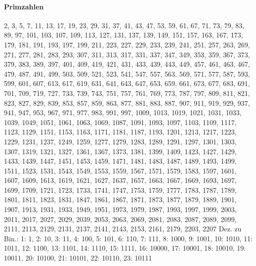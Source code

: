 \documentclass[8pt,a4paper,landscape]{article}
\begin{document}
\paragraph{Primzahlen}
\footnotesize 2,     3,     5,     7,    11,    13,    17,    19,    23,    29,    31,    37,    41,    43,
   47,    53,    59,    61,    67,    71,    73,    79,    83,    89,    97,   101,   103,   107,
  109,   113,   127,   131,   137,   139,   149,   151,   157,   163,   167,   173,   179,   181,
  191,   193,   197,   199,   211,   223,   227,   229,   233,   239,   241,   251,   257,   263,
  269,   271,   277,   281,   283,   293,   307,   311,   313,   317,   331,   337,   347,   349,
  353,   359,   367,   373,   379,   383,   389,   397,   401,   409,   419,   421,   431,   433,
  439,   443,   449,   457,   461,   463,   467,   479,   487,   491,   499,   503,   509,   521,
  523,   541,   547,   557,   563,   569,   571,   577,   587,   593,   599,   601,   607,   613,
  617,   619,   631,   641,   643,   647,   653,   659,   661,   673,   677,   683,   691,   701,
  709,   719,   727,   733,   739,   743,   751,   757,   761,   769,   773,   787,   797,   809,
  811,   821,   823,   827,   829,   839,   853,   857,   859,   863,   877,   881,   883,   887,
  907,   911,   919,   929,   937,   941,   947,   953,   967,   971,   977,   983,   991,   997,
 1009,  1013,  1019,  1021,  1031,  1033,  1039,  1049,  1051,  1061,  1063,  1069,  1087,  1091,
 1093,  1097,  1103,  1109,  1117,  1123,  1129,  1151,  1153,  1163,  1171,  1181,  1187,  1193,
 1201,  1213,  1217,  1223,  1229,  1231,  1237,  1249,  1259,  1277,  1279,  1283,  1289,  1291,
 1297,  1301,  1303,  1307,  1319,  1321,  1327,  1361,  1367,  1373,  1381,  1399,  1409,  1423,
 1427,  1429,  1433,  1439,  1447,  1451,  1453,  1459,  1471,  1481,  1483,  1487,  1489,  1493,
 1499,  1511,  1523,  1531,  1543,  1549,  1553,  1559,  1567,  1571,  1579,  1583,  1597,  1601,
 1607,  1609,  1613,  1619,  1621,  1627,  1637,  1657,  1663,  1667,  1669,  1693,  1697,  1699,
 1709,  1721,  1723,  1733,  1741,  1747,  1753,  1759,  1777,  1783,  1787,  1789,  1801,  1811,
 1823,  1831,  1847,  1861,  1867,  1871,  1873,  1877,  1879,  1889,  1901,  1907,  1913,  1931,
 1933,  1949,  1951,  1973,  1979,  1987,  1993,  1997,  1999,  2003,  2011,  2017,  2027,  2029,
 2039,  2053,  2063,  2069,  2081,  2083,  2087,  2089,  2099,  2111,  2113,  2129,  2131,  2137,
 2141,  2143,  2153,  2161,  2179,  2203,  2207
 Dez. zu Bin.: 1: 1, 2: 10, 3: 11, 4: 100, 5: 101, 6: 110, 7: 111, 8: 1000, 9: 1001, 10: 1010, 11: 1011, 12: 1100, 13: 1101, 14: 1110, 15: 1111, 16: 10000, 17: 10001, 18: 10010, 19: 10011, 20: 10100, 21: 10101, 22: 10110, 23: 10111
\end{document}

